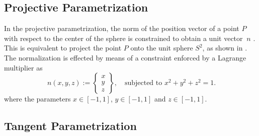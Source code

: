 \documentclass[12pt]{article}
\numberwithin{equation}{section}
\begin{document}
\subsection{Projective Parametrization}
\label{subsec:projective}

In the projective parametrization, the norm of the position vector of
a point $P$ with respect to the center of the sphere is constrained to
obtain a unit vector $~n$ \citep{Ortiz.etal:1987}. This is
equivalent to project the point $P$ onto the unit sphere $S^2$, as
shown in . The normalization is effected
by means of a constraint enforced by a Lagrange multiplier as
\begin{equation}
  ~n(x,y,z)
  :=
  \begin{Bmatrix}
    x
    \\
    y
    \\
    z
  \end{Bmatrix},
  \quad
  \text{subjected to } x^2+y^2+z^2 = 1.
\end{equation}
where the parameters $x \in [-1, 1]$, $y \in [-1, 1]$
and $z \in [-1, 1]$.

\subsection{Tangent Parametrization}
\label{subsec:tangent}
\end{document}
